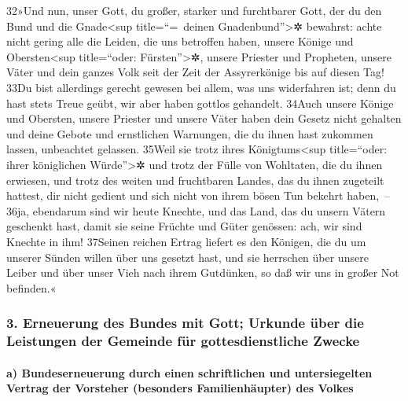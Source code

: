 32»Und nun, unser Gott, du großer, starker und furchtbarer Gott, der du
den Bund und die Gnade\textless sup title=``=~deinen
Gnadenbund''\textgreater✲ bewahrst: achte nicht gering alle die Leiden,
die uns betroffen haben, unsere Könige und Obersten\textless sup
title=``oder: Fürsten''\textgreater✲, unsere Priester und Propheten,
unsere Väter und dein ganzes Volk seit der Zeit der Assyrerkönige bis
auf diesen Tag! 33Du bist allerdings gerecht gewesen bei allem, was uns
widerfahren ist; denn du hast stets Treue geübt, wir aber haben gottlos
gehandelt. 34Auch unsere Könige und Obersten, unsere Priester und unsere
Väter haben dein Gesetz nicht gehalten und deine Gebote und ernstlichen
Warnungen, die du ihnen hast zukommen lassen, unbeachtet gelassen.
35Weil sie trotz ihres Königtums\textless sup title=``oder: ihrer
königlichen Würde''\textgreater✲ und trotz der Fülle von Wohltaten, die
du ihnen erwiesen, und trotz des weiten und fruchtbaren Landes, das du
ihnen zugeteilt hattest, dir nicht gedient und sich nicht von ihrem
bösen Tun bekehrt haben,~-- 36ja, ebendarum sind wir heute Knechte, und
das Land, das du unsern Vätern geschenkt hast, damit sie seine Früchte
und Güter genössen: ach, wir sind Knechte in ihm! 37Seinen reichen
Ertrag liefert es den Königen, die du um unserer Sünden willen über uns
gesetzt hast, und sie herrschen über unsere Leiber und über unser Vieh
nach ihrem Gutdünken, so daß wir uns in großer Not befinden.«

\hypertarget{erneuerung-des-bundes-mit-gott-urkunde-uxfcber-die-leistungen-der-gemeinde-fuxfcr-gottesdienstliche-zwecke}{%
\subsubsection{3. Erneuerung des Bundes mit Gott; Urkunde über die
Leistungen der Gemeinde für gottesdienstliche
Zwecke}\label{erneuerung-des-bundes-mit-gott-urkunde-uxfcber-die-leistungen-der-gemeinde-fuxfcr-gottesdienstliche-zwecke}}

\hypertarget{a-bundeserneuerung-durch-einen-schriftlichen-und-untersiegelten-vertrag-der-vorsteher-besonders-familienhuxe4upter-des-volkes}{%
\paragraph{a) Bundeserneuerung durch einen schriftlichen und
untersiegelten Vertrag der Vorsteher (besonders Familienhäupter) des
Volkes}\label{a-bundeserneuerung-durch-einen-schriftlichen-und-untersiegelten-vertrag-der-vorsteher-besonders-familienhuxe4upter-des-volkes}}

